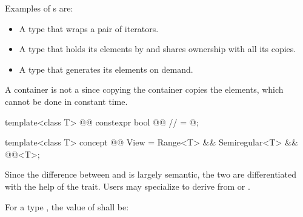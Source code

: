 {\pnum
\begin{example}
Examples of s are:

\begin{itemize}
\item A  type that wraps a pair of iterators.

\item A  type that holds its elements by 
and shares ownership with all its copies.

\item A  type that generates its elements on demand.
\end{itemize}

A container is not a  since copying the
container copies the elements, which cannot be done in constant time.
\end{example}

%
\begin{itemdecl}
template<class T>
@@ constexpr bool @@ // \expos
  = @\seebelownc@;

template<class T>
concept @@ View =
  Range<T> &&
  Semiregular<T> &&
  @@<T>;
\end{itemdecl}

\begin{itemdescr}
\pnum
Since the difference between  and  is largely semantic, the
two are differentiated with the help of the 
trait. Users may specialize 
to derive from  or .

\pnum
For a type , the value of  shall be:
\begin{itemize}


\end{itemize}
\end{itemdescr}}
